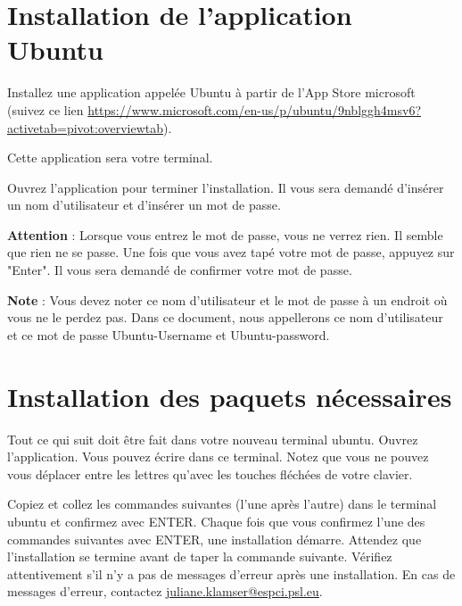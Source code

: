 \documentclass{article}
\begin{document}
\section{Installation de l'application Ubuntu}
Installez une application appelée Ubuntu à partir de l'App Store microsoft (suivez ce lien \href{https://www.microsoft.com/en-us/p/ubuntu/9nblggh4msv6?activetab=pivot:overviewtab}{https://www.microsoft.com/en-us/p/ubuntu/9nblggh4msv6?activetab=pivot:overviewtab}).

Cette application sera votre terminal. 

Ouvrez l'application pour terminer l'installation. 
Il vous sera demandé d'insérer un nom d'utilisateur et d'insérer un mot de passe. 

\textbf{Attention} : Lorsque vous entrez le mot de passe, vous ne verrez rien. Il semble que rien ne se passe. Une fois que vous avez tapé votre mot de passe, appuyez sur "Enter". Il vous sera demandé de confirmer votre mot de passe.

\textbf{Note} : Vous devez noter ce nom d'utilisateur et le mot de passe à un endroit où vous ne le perdez pas. Dans ce document, nous appellerons ce nom d'utilisateur et ce mot de passe Ubuntu-Username et Ubuntu-password.

\section{Installation des paquets nécessaires}

Tout ce qui suit doit être fait dans votre nouveau terminal ubuntu. Ouvrez l'application. Vous pouvez écrire dans ce terminal. Notez que vous ne pouvez vous déplacer entre les lettres qu'avec les touches fléchées de votre clavier. 

Copiez et collez les commandes suivantes (l'une après l'autre) dans le terminal ubuntu et confirmez avec ENTER. Chaque fois que vous confirmez l'une des commandes suivantes avec ENTER, une installation démarre.  Attendez que l'installation se termine avant de taper la commande suivante. Vérifiez attentivement s'il n'y a pas de messages d'erreur après une installation. En cas de messages d'erreur, contactez \href{mailto:example@example.com}{juliane.klamser@espci.psl.eu}.
\end{document}
